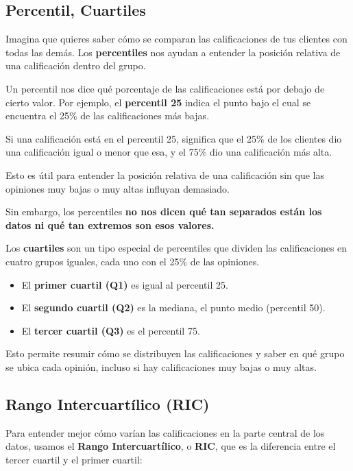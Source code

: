 \documentclass[
  spanish,
  letterpaper,
  DIV=11,
  numbers=noendperiod]{scrreprt}
\providecommand{\tightlist}{%
  \setlength{\itemsep}{0pt}\setlength{\parskip}{0pt}}
\begin{document}
\subsection{Percentil, Cuartiles}\label{percentil-cuartiles}

Imagina que quieres saber cómo se comparan las calificaciones de tus
clientes con todas las demás. Los \textbf{percentiles} nos ayudan a
entender la posición relativa de una calificación dentro del grupo.

Un percentil nos dice qué porcentaje de las calificaciones está por
debajo de cierto valor. Por ejemplo, el \textbf{percentil 25} indica el
punto bajo el cual se encuentra el 25\% de las calificaciones más bajas.

Si una calificación está en el percentil 25, significa que el 25\% de
los clientes dio una calificación igual o menor que esa, y el 75\% dio
una calificación más alta.

Esto es útil para entender la posición relativa de una calificación sin
que las opiniones muy bajas o muy altas influyan demasiado.

Sin embargo, los percentiles \textbf{no nos dicen qué tan separados
están los datos ni qué tan extremos son esos valores.}

Los \textbf{cuartiles} son un tipo especial de percentiles que dividen
las calificaciones en cuatro grupos iguales, cada uno con el 25\% de las
opiniones.

\begin{itemize}
\tightlist
\item
  El \textbf{primer cuartil (Q1)} es igual al percentil 25.\\
\item
  El \textbf{segundo cuartil (Q2)} es la mediana, el punto medio
  (percentil 50).\\
\item
  El \textbf{tercer cuartil (Q3)} es el percentil 75.
\end{itemize}

Esto permite resumir cómo se distribuyen las calificaciones y saber en
qué grupo se ubica cada opinión, incluso si hay calificaciones muy bajas
o muy altas.

\subsection{Rango Intercuartílico
(RIC)}\label{rango-intercuartuxedlico-ric}

Para entender mejor cómo varían las calificaciones en la parte central
de los datos, usamos el \textbf{Rango Intercuartílico}, o \textbf{RIC},
que es la diferencia entre el tercer cuartil y el primer cuartil:
\end{document}
